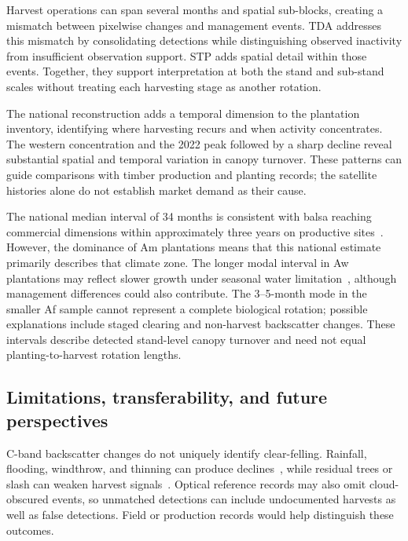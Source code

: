 Harvest operations can span several months and spatial sub-blocks, creating a mismatch between pixelwise changes and management events. TDA addresses this mismatch by consolidating detections while distinguishing observed inactivity from insufficient observation support. STP adds spatial detail within those events. Together, they support interpretation at both the stand and sub-stand scales without treating each harvesting stage as another rotation.

The national reconstruction adds a temporal dimension to the plantation inventory, identifying where harvesting recurs and when activity concentrates. The western concentration and the 2022 peak followed by a sharp decline reveal substantial spatial and temporal variation in canopy turnover. These patterns can guide comparisons with timber production and planting records; the satellite histories alone do not establish market demand as their cause.

The national median interval of 34 months is consistent with balsa reaching commercial dimensions within approximately three years on productive sites~\citep{GonzalezOsorio2010Balsa,CanadasLopez2019BalsaGrowth}. However, the dominance of Am plantations means that this national estimate primarily describes that climate zone. The longer modal interval in Aw plantations may reflect slower growth under seasonal water limitation~\citep{Yuan2026BalsaWaterUse}, although management differences could also contribute. The 3--5-month mode in the smaller Af sample cannot represent a complete biological rotation; possible explanations include staged clearing and non-harvest backscatter changes. These intervals describe detected stand-level canopy turnover and need not equal planting-to-harvest rotation lengths.

\subsection{Limitations, transferability, and future perspectives}
\label{sec:discussion_limitations}

C-band backscatter changes do not uniquely identify clear-felling. Rainfall, flooding, windthrow, and thinning can produce declines~\citep{Doblas2020Rainfall}, while residual trees or slash can weaken harvest signals~\citep{Balling2023Texture}. Optical reference records may also omit cloud-obscured events, so unmatched detections can include undocumented harvests as well as false detections. Field or production records would help distinguish these outcomes.

